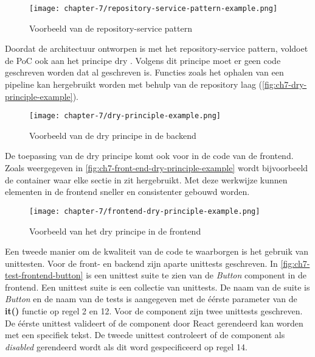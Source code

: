 \begin{figure}[hbt!]
  \centering
  \texttt{[image: chapter-7/repository-service-pattern-example.png]}
  \caption{Voorbeeld van de repository-service pattern}
  \label{fig:ch7-repository-service-pattern-example}
\end{figure}

Doordat de architectuur ontworpen is met het repository-service pattern, voldoet de PoC ook aan het principe \acrfull{dry} \cite{clean-code-martin}. Volgens dit principe moet er geen code geschreven worden dat al geschreven is. Functies zoals het ophalen van een pipeline kan hergebruikt worden met behulp van de repository laag (\autoref{fig:ch7-dry-principle-example}).

\begin{figure}[hbt!]
  \centering
  \texttt{[image: chapter-7/dry-principle-example.png]}
  \caption{Voorbeeld van de \acrfull{dry} principe in de backend}
  \label{fig:ch7-dry-principle-example}
\end{figure}

De toepassing van de \acrshort{dry} principe komt ook voor in de code van de frontend. Zoals weergegeven in \autoref{fig:ch7-front-end-dry-principle-example} wordt bijvoorbeeld de container waar elke sectie in zit hergebruikt. Met deze werkwijze kunnen elementen in de frontend sneller en consistenter gebouwd worden.

\begin{figure}[hbt!]
  \centering
  \texttt{[image: chapter-7/frontend-dry-principle-example.png]}
  \caption{Voorbeeld van het \acrfull{dry} principe in de frontend}
  \label{fig:ch7-front-end-dry-principle-example}
\end{figure}

\newpage

Een tweede manier om de kwaliteit van de code te waarborgen is het gebruik van unittesten. Voor de front- en backend zijn aparte unittests geschreven. In \autoref{fig:ch7-test-frontend-button} is een unittest suite te zien van de \textit{Button} component in de frontend. Een unittest suite is een collectie van unittests. De naam van de suite is \textit{Button} en de naam van de tests is aangegeven met de éérste parameter van de \textbf{it()} functie op regel 2 en 12. Voor de component zijn twee unittests geschreven. De éérste unittest valideert of de component door React gerendeerd kan worden met een specifiek tekst. De tweede unittest controleert of de component als \textit{disabled} gerendeerd wordt als dit word gespecificeerd op regel 14.

